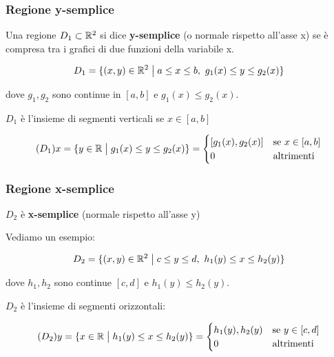 \subsubsection*{Regione y-semplice}

Una regione \(D_1 \subset \mathbb{R}^2\) si dice \textbf{y-semplice} (o normale rispetto all'asse x) se è compresa tra i grafici di due funzioni della variabile x.

\[
    D_1= \{(x,y) \in \mathbb{R}^2 \;\big|\; a \le x \le b,\ g_1(x) \le y \le g_2(x)\}
\]

dove \(g_1,g_2\) sono continue in \([a,b]\) e \(g_1(x) \le g_2(x)\).

\(D_1\) è l'insieme di segmenti verticali se \(x \in [a,b]\)

\[
    (D_1)x = \{y \in \mathbb{R} \;\big|\; g_1(x) \le y \le g_2(x)\} = \begin{cases}
        [g_1(x),g_2(x)] & \text{se \(x \in [a,b]\)} \\
        0               & \text{altrimenti}
    \end{cases}
\]

\subsubsection*{Regione x-semplice}

\(D_2\) è \textbf{x-semplice} (normale rispetto all'asse y)

Vediamo un esempio:

\[
    D_2= \{(x,y) \in \mathbb{R}^2 \;\big|\; c \le y \le d,\ h_1(y) \le x \le h_2(y)\}
\]

dove \(h_1,h_2\) sono continue \([c,d]\) e \(h_1(y) \le h_2(y)\).

\(D_2\) è l'insieme di segmenti orizzontali:

\[
    (D_2) y = \{x \in \mathbb{R} \;\big|\; h_1(y) \le x \le h_2(y)\} = \begin{cases}
        h_1(y),h_2(y) & \text{se \(y \in [c,d]\)} \\
        0             & \text{altrimenti}
    \end{cases}
\]


